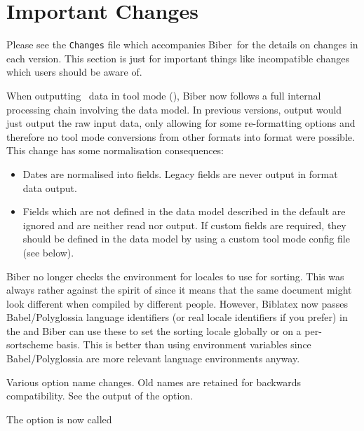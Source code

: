 \documentclass{ltxdockit}
\newcommand*{\biber}{Biber\xspace}
\newcommand*{\biblatex}{Biblatex\xspace}
\begin{document}
\printtitlepage
\tableofcontents

\section{Important Changes}\label{special}

Please see the \verb+Changes+ file which accompanies \biber\ for the
details on changes in each version. This section is just for important
things like incompatible changes which users should be aware of.

When outputting \bibtex\ data in tool mode (), \biber now
follows a full internal processing chain involving the data model. In
previous versions, \bibtex output would just output the raw
\bibtex input data, only allowing for some re-formatting options and
therefore no tool mode conversions from other formats into \bibtex format
were possible. This change has some normalisation consequences:

\begin{itemize}
\item Dates are normalised into  fields. Legacy
   fields are never output in \bibtex format data output.
\item Fields which are not defined in the data model described in the
  default  are ignored and are neither read nor
  output. If custom fields are required, they should be defined in the data
  model by using a custom tool mode config file (see below).
\end{itemize}

\biber no longer checks the environment for locales to use for sorting. This
was always rather against the spirit of \tex since it means that the same
document might look different when compiled by different people. However,
\biblatex now passes Babel/Polyglossia language identifiers (or real locale
identifiers if you prefer) in the  and \biber can use these to
set the sorting locale globally or on a per-sortscheme basis. This is better
than using environment variables since Babel/Polyglossia are more \latex
relevant language environments anyway.

Various option name changes. Old names are retained for backwards
compatibility. See the output of the  option.

The  option is now called 
\end{document}
